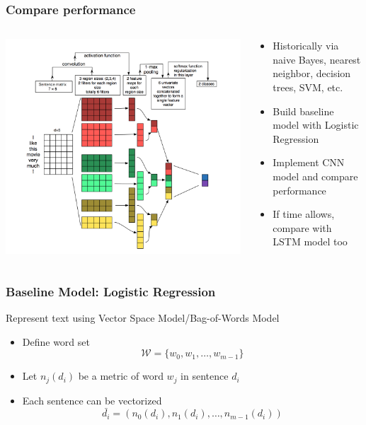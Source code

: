 \documentclass{beamer}
\begin{document}
\begin{frame}
\frametitle{Compare performance}
    \begin{columns}
    \begin{column}{0.5\textwidth}
    \center\includegraphics[width=\textwidth]{figure/sc_cnn}
    \end{column}
    \begin{column}{0.5\textwidth}
    \begin{itemize}
        \item Historically via naive Bayes, nearest neighbor, decision trees, SVM, etc.
        \item Build baseline model with Logistic Regression
        \item Implement CNN model and compare performance
        \item If time allows, compare with LSTM model too
    \end{itemize}
    \end{column}
    \end{columns}
\end{frame}

\begin{frame}
\frametitle{Baseline Model: Logistic Regression}
    Represent text using Vector Space Model/Bag-of-Words Model
    \begin{itemize}
        \item Define word set $$\mathcal{W}=\{w_0, w_1,\ldots, w_{m-1}\}$$
        \item Let $n_j(d_i)$ be a metric of word $w_j$ in sentence $d_i$
        \item Each sentence can be vectorized
        $$\bar{d_i}=(n_0(d_i),n_1(d_i),\ldots,n_{m-1}(d_i))$$
    \end{itemize}
\end{frame}
\end{document}
